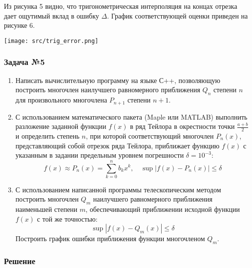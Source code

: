 \documentclass[a4paper, fontsize=14pt]{article}
\begin{document}
    Из рисунка 5 видно, что тригонометрическая интерполяция на концах отрезка дает ощутимый вклад в ошибку $\Delta$.
    График соответствующей оценки приведен на рисунке 6.

    \begin{center}
        \texttt{[image: src/trig\_error.png]}
    \end{center}
    \subsubsection*{Задача №5}
    \begin{enumerate}
        \item Написать вычислительную программу на языке С++, позволяющую построить многочлен наилучшего равномерного приближения $Q_n$ степени $n$ для произвольного многочлена $P_{n+1}$ степени $n+1$.
        \item С использованием математического пакета (Maple или MATLAB) выполнить разложение заданной функции $f(x)$ в ряд Тейлора в окрестности точки $\frac{a+b}{2}$ и определить степень $n$, при которой соответствующий многочлен $P_n(x)$, представляющий собой отрезок ряда Тейлора, приближает функцию $f(x)$ с указанным в задании предельным уровнем погрешности $\delta = 10^{-3}$:
        \begin{equation*}
            f(x) \approx P_n (x)=\sum_{k=0}^n b_k x^k,  \quad    \operatorname{sup} |f(x)-P_n (x)| \leq \delta
        \end{equation*}
        \item 	С использованием написанной программы телескопическим методом построить многочлен $Q_m$ наилучшего равномерного приближения наименьшей степени $m$, обеспечивающий приближении исходной функции $f(x)$ с той же точностью:
        \begin{equation*}
            \operatorname{sup} |f(x)-Q_m (x)| \leq \delta
        \end{equation*}
        Построить график ошибки приближения функции многочленом $Q_m$.
        
    \end{enumerate}
    \subsubsection*{Решение}
\end{document}
